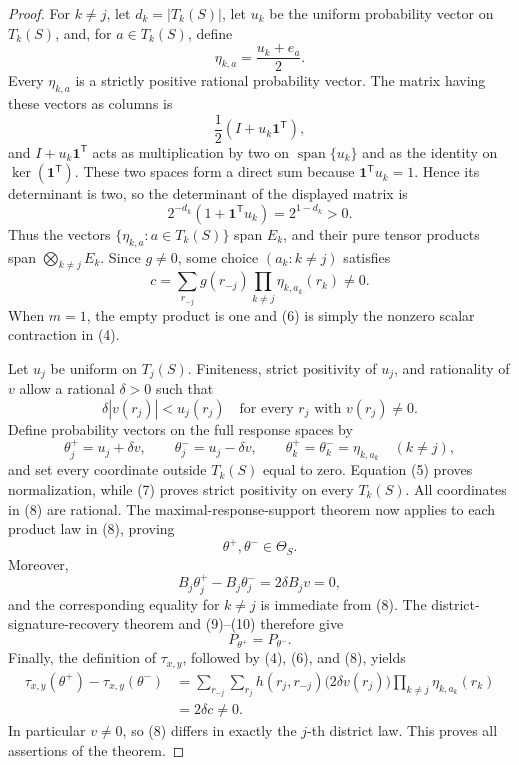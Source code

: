 \documentclass{article}
\begin{document}
\begin{proof}
For \(k\ne j\), let \(d_k=|T_k(S)|\), let \(u_k\) be the uniform probability vector on \(T_k(S)\), and, for \(a\in T_k(S)\), define
\[
\eta_{k,a}=\frac{u_k+e_a}{2}.
\]
Every \(\eta_{k,a}\) is a strictly positive rational probability vector.  The matrix having these vectors as columns is
\[
\frac12\left(I+u_k\mathbf 1^{\mathsf T}\right),
\]
and \(I+u_k\mathbf 1^{\mathsf T}\) acts as multiplication by two on \(\operatorname{span}\{u_k\}\) and as the identity on \(\ker(\mathbf 1^{\mathsf T})\).  These two spaces form a direct sum because \(\mathbf 1^{\mathsf T}u_k=1\).  Hence its determinant is two, so the determinant of the displayed matrix is
\[
2^{-d_k}\left(1+\mathbf 1^{\mathsf T}u_k\right)=2^{1-d_k}>0.
\]
Thus the vectors \(\{\eta_{k,a}:a\in T_k(S)\}\) span \(E_k\), and their pure tensor products span \(\bigotimes_{k\ne j}E_k\).  Since \(g\ne0\), some choice \((a_k:k\ne j)\) satisfies
\[
c=\sum_{r_{-j}}g(r_{-j})
       \prod_{k\ne j}\eta_{k,a_k}(r_k)\ne0.                 \tag{6}
\]
When \(m=1\), the empty product is one and (6) is simply the nonzero scalar contraction in (4).

Let \(u_j\) be uniform on \(T_j(S)\).  Finiteness, strict positivity of \(u_j\), and rationality of \(v\) allow a rational \(\delta>0\) such that
\[
\delta |v(r_j)|<u_j(r_j)
\quad\text{for every }r_j\text{ with }v(r_j)\ne0.            \tag{7}
\]
Define probability vectors on the full response spaces by
\[
\theta_j^+=u_j+\delta v,
\qquad
\theta_j^-=u_j-\delta v,
\qquad
\theta_k^+=\theta_k^-=\eta_{k,a_k}\quad(k\ne j),             \tag{8}
\]
and set every coordinate outside \(T_k(S)\) equal to zero.  Equation (5) proves normalization, while (7) proves strict positivity on every \(T_k(S)\).  All coordinates in (8) are rational.  The maximal-response-support theorem now applies to each product law in (8), proving
\[
\theta^+,\theta^-\in\Theta_S.                                \tag{9}
\]
Moreover,
\[
B_j\theta_j^+-B_j\theta_j^-=2\delta B_jv=0,                  \tag{10}
\]
and the corresponding equality for \(k\ne j\) is immediate from (8).  The district-signature-recovery theorem and (9)--(10) therefore give
\[
P_{\theta^+}=P_{\theta^-}.                                   \tag{11}
\]
Finally, the definition of \(\tau_{x,y}\), followed by (4), (6), and (8), yields
\[
\begin{aligned}
\tau_{x,y}(\theta^+)-\tau_{x,y}(\theta^-)
&=\sum_{r_{-j}}\sum_{r_j}h(r_j,r_{-j})
  \bigl(2\delta v(r_j)\bigr)
  \prod_{k\ne j}\eta_{k,a_k}(r_k)\\
&=2\delta c\ne0.                                             \tag{12}
\end{aligned}
\]
In particular \(v\ne0\), so (8) differs in exactly the \(j\)-th district law.  This proves all assertions of the theorem.


\end{proof}
\end{document}
